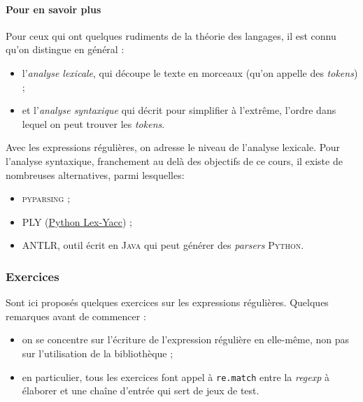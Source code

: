 \paragraph{Pour en savoir plus}
Pour ceux qui ont quelques rudiments de la théorie des langages, il est connu qu'on distingue en général :
\begin{itemize}
\item l'\emph{analyse lexicale}, qui découpe le texte en morceaux (qu'on appelle des \textit{tokens}) ;
\item et l'\emph{analyse syntaxique} qui décrit pour simplifier à l'extrême, l'or\-dre dans lequel on peut trouver les \textit{tokens}.
\end{itemize}

Avec les expressions régulières, on adresse le niveau de l'analyse lexicale. Pour l'analyse syntaxique, franchement au delà des objectifs de ce cours, il existe de nombreuses alternatives, parmi lesquelles:
\begin{itemize}
\item \textsc{pyparsing} ;
\item \textsc{PLY} (\href{http://www.dabeaz.com/ply/}{Python Lex-Yacc}) ;
\item \textsc{ANTLR}, outil écrit en \textsc{Java} qui peut générer des \textit{parsers} \textsc{Python}.
\end{itemize}


\subsubsection[Exercices]{Exercices}
\label{subsub:XI.1.2.2}

Sont ici proposés quelques exercices sur les expressions régulières. Quelques remarques avant de commencer :
\begin{itemize}
\item on se concentre sur l'écriture de l'expression régulière en elle-même, non pas sur l'utilisation de la bibliothèque ;
\item en particulier, tous les exercices font appel à \texttt{re.match} entre la \textit{regexp} à élaborer et une chaîne d'entrée qui sert de jeux de test.
\end{itemize}


